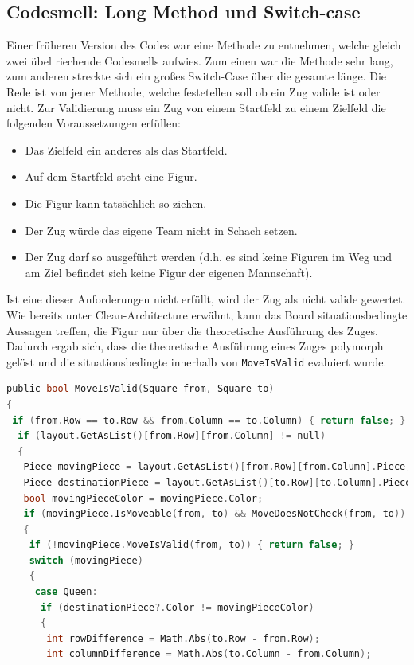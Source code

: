 \documentclass[
10pt, %
a4paper, %
oneside, %
headinclude,footinclude, %
BCOR5mm, %
]{scrartcl}
\begin{document}
\begin{onehalfspace}
\subsection{Codesmell: Long Method und Switch-case}
Einer früheren Version des Codes war eine Methode zu entnehmen, welche gleich zwei übel riechende Codesmells aufwies. Zum einen war die Methode sehr lang, zum anderen streckte sich ein großes Switch-Case über die gesamte länge. Die Rede ist von jener Methode, welche festetellen soll ob ein Zug valide ist oder nicht. Zur Validierung muss ein Zug von einem Startfeld zu einem Zielfeld die folgenden Voraussetzungen erfüllen:
\begin{center}
	\begin{itemize}
		\item Das Zielfeld ein anderes als das Startfeld.
		\item Auf dem Startfeld steht eine Figur.
		\item Die Figur kann tatsächlich so ziehen.
		\item Der Zug würde das eigene Team nicht in Schach setzen.
		\item Der Zug darf so ausgeführt werden (d.h. es sind keine Figuren im Weg und am Ziel befindet sich keine Figur der eigenen Mannschaft).
	\end{itemize}
\end{center}
Ist eine dieser Anforderungen nicht erfüllt, wird der Zug als nicht valide gewertet. Wie bereits unter Clean-Architecture erwähnt, kann das Board situationsbedingte Aussagen treffen, die Figur nur über die theoretische Ausführung des Zuges. Dadurch ergab sich, dass die theoretische Ausführung eines Zuges polymorph gelöst und die situationsbedingte innerhalb von \texttt{MoveIsValid} evaluiert wurde. 
\vspace{0.5cm}

\begin{lstlisting}[language=c, style=mStyle]
public bool MoveIsValid(Square from, Square to)
{
 if (from.Row == to.Row && from.Column == to.Column) { return false; }
  if (layout.GetAsList()[from.Row][from.Column] != null)
  {
   Piece movingPiece = layout.GetAsList()[from.Row][from.Column].Piece;
   Piece destinationPiece = layout.GetAsList()[to.Row][to.Column].Piece;
   bool movingPieceColor = movingPiece.Color;
   if (movingPiece.IsMoveable(from, to) && MoveDoesNotCheck(from, to))
   {
	if (!movingPiece.MoveIsValid(from, to)) { return false; }
	switch (movingPiece)
	{
	 case Queen:
	  if (destinationPiece?.Color != movingPieceColor)
	  {
	   int rowDifference = Math.Abs(to.Row - from.Row);
	   int columnDifference = Math.Abs(to.Column - from.Column);


\end{lstlisting}
\end{onehalfspace}
\end{document}
